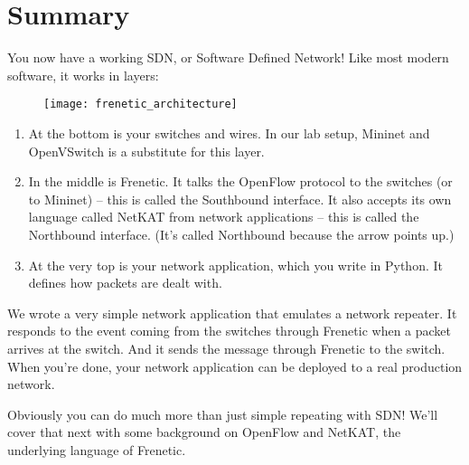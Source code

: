 \section{Summary}

You now have a working SDN, or Software Defined Network!   Like most modern software, it works in layers:

\begin{figure}[h]
\centering
\texttt{[image: frenetic\_architecture]}
\end{figure}

\begin{enumerate}
\item At the bottom is your switches and wires.  In our lab setup, Mininet and OpenVSwitch is a substitute for this layer.
\item In the middle is Frenetic.  It talks the OpenFlow protocol to the switches (or to Mininet) -- this is called the Southbound interface.  It also accepts its own language called NetKAT from network applications -- this is called the Northbound interface.  (It's called Northbound because the arrow points up.)
\item At the very top is your network application, which you write in Python.  It defines how packets are dealt with.
\end{enumerate}

We wrote a very simple network application that emulates a network repeater.   
It responds to the  event coming from the switches through Frenetic when a packet 
arrives at the switch.  
And it sends the  message through Frenetic to the switch.  
When you're done, your network application can be deployed to a real production network.

Obviously you can do much more than just simple repeating with SDN!  
We'll cover that next with some background on OpenFlow and NetKAT, the underlying language of Frenetic. 